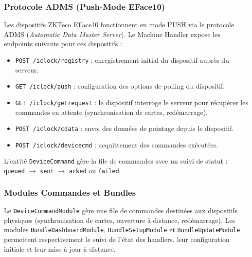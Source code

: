 ﻿\documentclass[../main.tex]{subfiles}
\begin{document}
\subsubsection{Protocole ADMS (Push-Mode EFace10)}

Les dispositifs ZKTeco EFace10 fonctionnent en mode PUSH via le protocole ADMS (\textit{Automatic Data Master Server}). Le Machine Handler expose les endpoints suivants pour ces dispositifs :

\begin{itemize}
  \item \begin{sloppypar}\texttt{POST /iclock/registry} : enregistrement initial du dispositif aupr\`{e}s du serveur.\end{sloppypar}
  \item \begin{sloppypar}\texttt{GET /iclock/push} : configuration des options de polling du dispositif.\end{sloppypar}
  \item \begin{sloppypar}\texttt{GET /iclock/getrequest} : le dispositif interroge le serveur pour r\'{e}cup\'{e}rer les commandes en attente (synchronisation de cartes, red\'{e}marrage).\end{sloppypar}
  \item \begin{sloppypar}\texttt{POST /iclock/cdata} : envoi des donn\'{e}es de pointage depuis le dispositif.\end{sloppypar}
  \item \begin{sloppypar}\texttt{POST /iclock/devicecmd} : acquittement des commandes ex\'{e}cut\'{e}es.\end{sloppypar}
\end{itemize}

\begin{sloppypar}
L'entit\'{e} \texttt{DeviceCommand} g\`{e}re la file de commandes avec un suivi de statut : \texttt{queued} $\rightarrow$ \texttt{sent} $\rightarrow$ \texttt{acked} ou \texttt{failed}.
\end{sloppypar}

\subsubsection{Modules Commandes et Bundles}

\begin{sloppypar}
Le \texttt{DeviceCommandModule} g\`{e}re une file de commandes destin\'{e}es aux dispositifs physiques (synchronisation de cartes, ouverture \`{a} distance, red\'{e}marrage). Les modules \texttt{BundleDashboardModule}, \texttt{BundleSetupModule} et \texttt{BundleUpdateModule} permettent respectivement le suivi de l'\'{e}tat des handlers, leur configuration initiale et leur mise \`{a} jour \`{a} distance.
\end{sloppypar}
\end{document}
